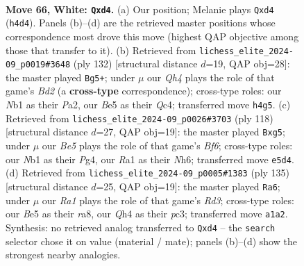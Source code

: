 \documentclass[11pt]{article}
\begin{document}
\clearpage

\begin{figure}[p]\centering
\begin{subfigure}{0.46\textwidth}\centering
\resizebox{\linewidth}{!}{%
\newchessgame
\chessboard[
  setfen={8/1k6/8/p3Bp2/P2p3Q/8/8/RN4K1 w - - 0 66},
  showmover=false,
  pgfstyle=straightmove, color=movearrow, markmove={h4-d4}
]}
\caption{}
\end{subfigure}\hfill
\begin{subfigure}{0.46\textwidth}\centering
\resizebox{\linewidth}{!}{%
\newchessgame
\chessboard[
  setfen={3k1N2/p7/8/8/1pQ5/8/P1pB1K1P/8 w - - 3 67},
  showmover=false,
  pgfstyle=straightmove, color=movearrow, markmove={d2-g5}
]}
\caption{}
\end{subfigure}
\\[4pt]
\begin{subfigure}{0.46\textwidth}\centering
\resizebox{\linewidth}{!}{%
\newchessgame
\chessboard[
  setfen={8/8/5B1N/3k2p1/p5P1/P7/3K4/8 w - - 1 60},
  showmover=false,
  pgfstyle=straightmove, color=movearrow, markmove={f6-g5}
]}
\caption{}
\end{subfigure}\hfill
\begin{subfigure}{0.46\textwidth}\centering
\resizebox{\linewidth}{!}{%
\newchessgame
\chessboard[
  setfen={R7/p7/3r3p/7P/8/2P5/P4k2/K3n3 b - - 1 68},
  showmover=false,
  pgfstyle=straightmove, color=movearrow, markmove={d6-a6}
]}
\caption{}
\end{subfigure}
\caption{\textbf{Move 66, White: \texttt{Qxd4}.} (a) Our position; Melanie plays \texttt{Qxd4} (\texttt{h4d4}). Panels (b)--(d) are the retrieved master positions whose correspondence most drove this move (highest QAP objective among those that transfer to it). (b) Retrieved from \texttt{lichess\_elite\_2024-09\_p0019\#3648} (ply 132) [structural distance $d$=19, QAP obj=28]: the master played \texttt{Bg5+}; under $\mu$ our \emph{Qh4} plays the role of that game's \emph{Bd2} (a \textbf{cross-type} correspondence); cross-type roles: our \emph{N}b1 as their \emph{P}a2, our \emph{B}e5 as their \emph{Q}c4; transferred move \texttt{h4g5}. (c) Retrieved from \texttt{lichess\_elite\_2024-09\_p0026\#3703} (ply 118) [structural distance $d$=27, QAP obj=19]: the master played \texttt{Bxg5}; under $\mu$ our \emph{Be5} plays the role of that game's \emph{Bf6}; cross-type roles: our \emph{N}b1 as their \emph{P}g4, our \emph{R}a1 as their \emph{N}h6; transferred move \texttt{e5d4}. (d) Retrieved from \texttt{lichess\_elite\_2024-09\_p0005\#1383} (ply 135) [structural distance $d$=25, QAP obj=19]: the master played \texttt{Ra6}; under $\mu$ our \emph{Ra1} plays the role of that game's \emph{Rd3}; cross-type roles: our \emph{B}e5 as their \emph{r}a8, our \emph{Q}h4 as their \emph{p}c3; transferred move \texttt{a1a2}. Synthesis: no retrieved analog transferred to \texttt{Qxd4} -- the \texttt{search} selector chose it on value (material / mate); panels (b)--(d) show the strongest nearby analogies.}
\label{fig:thought-m130}
\end{figure}
\end{document}
